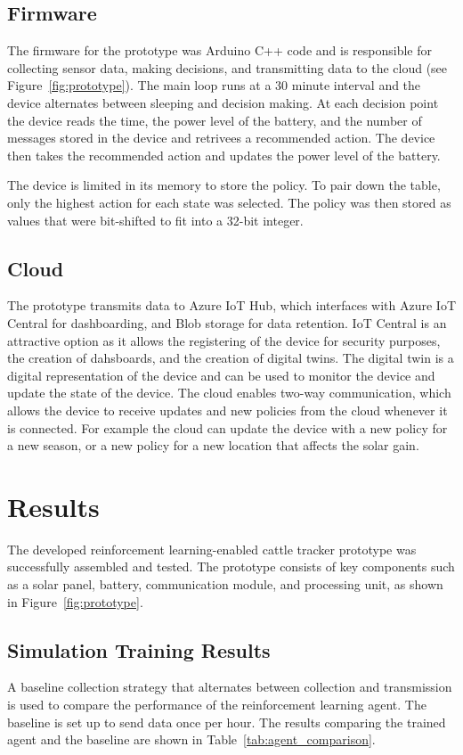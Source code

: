 \documentclass[10pt]{cai}
\begin{document}
\subsection{Firmware}
The firmware for the prototype was Arduino C++ code and is responsible for collecting sensor data, making decisions, and transmitting data to the cloud (see Figure~\ref{fig:prototype}).
The main loop runs at a 30 minute interval and the device alternates between sleeping and decision making.
At each decision point the device reads the time, the power level of the battery, and the number of messages stored in the device and retrivees a recommended action.
The device then takes the recommended action and updates the power level of the battery.

The device is limited in its memory to store the policy.
To pair down the table, only the highest action for each state was selected.
The policy was then stored as values that were bit-shifted to fit into a 32-bit integer.

\subsection{Cloud}
The prototype transmits data to Azure IoT Hub, which interfaces with Azure IoT Central for dashboarding, and Blob storage for data retention.
IoT Central is an attractive option as it allows the registering of the device for security purposes, the creation of dahsboards, and the creation of digital twins.
The digital twin is a digital representation of the device and can be used to monitor the device and update the state of the device.
The cloud enables two-way communication, which allows the device to receive updates and new policies from the cloud whenever it is connected.
For example the cloud can update the device with a new policy for a new season, or a new policy for a new location that affects the solar gain.


\section{Results}
The developed reinforcement learning-enabled cattle tracker prototype was successfully assembled and tested. 
The prototype consists of key components such as a solar panel, battery, communication module, and processing unit, as shown in Figure~\ref{fig:prototype}.

\subsection{Simulation Training Results}
A baseline collection strategy that alternates between collection and transmission is used to compare the performance of the reinforcement learning agent.
The baseline is set up to send data once per hour.
The results comparing the trained agent and the baseline are shown in Table~\ref{tab:agent_comparison}.
\end{document}
